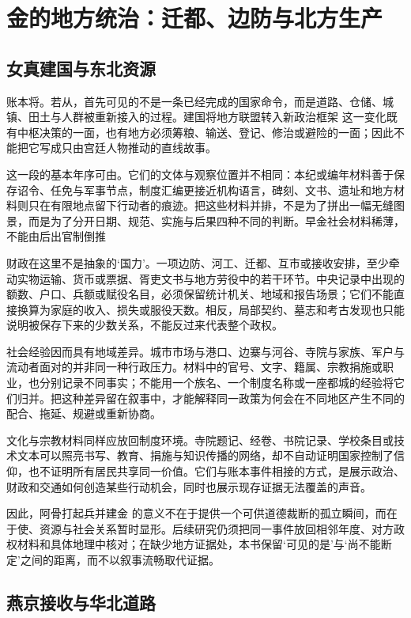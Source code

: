 \section{金的地方统治：迁都、边防与北方生产}

\subsection{女真建国与东北资源}

账本将。若从，首先可见的不是一条已经完成的国家命令，而是道路、仓储、城镇、田土与人群被重新接入的过程。建国将地方联盟转入新政治框架 这一变化既有中枢决策的一面，也有地方必须筹粮、输送、登记、修治或避险的一面；因此不能把它写成只由宫廷人物推动的直线故事。

这一段的基本年序可由。它们的文体与观察位置并不相同：本纪或编年材料善于保存诏令、任免与军事节点，制度汇编更接近机构语言，碑刻、文书、遗址和地方材料则只在有限地点留下行动者的痕迹。把这些材料并排，不是为了拼出一幅无缝图景，而是为了分开日期、规范、实施与后果四种不同的判断。早金社会材料稀薄，不能由后出官制倒推

财政在这里不是抽象的‘国力’。一项边防、河工、迁都、互市或接收安排，至少牵动实物运输、货币或票据、胥吏文书与地方劳役中的若干环节。中央记录中出现的额数、户口、兵额或赋役名目，必须保留统计机关、地域和报告场景；它们不能直接换算为家庭的收入、损失或服役天数。相反，局部契约、墓志和考古发现也只能说明被保存下来的少数关系，不能反过来代表整个政权。

社会经验因而具有地域差异。城市市场与港口、边寨与河谷、寺院与家族、军户与流动者面对的并非同一种行政压力。材料中的官号、文字、籍属、宗教捐施或职业，也分别记录不同事实；不能用一个族名、一个制度名称或一座都城的经验将它们归并。把这种差异留在叙事中，才能解释同一政策为何会在不同地区产生不同的配合、拖延、规避或重新协商。

文化与宗教材料同样应放回制度环境。寺院题记、经卷、书院记录、学校条目或技术文本可以照亮书写、教育、捐施与知识传播的网络，却不自动证明国家控制了信仰，也不证明所有居民共享同一价值。它们与账本事件相接的方式，是展示政治、财政和交通如何创造某些行动机会，同时也展示现存证据无法覆盖的声音。

因此，阿骨打起兵并建金 的意义不在于提供一个可供道德裁断的孤立瞬间，而在于使、资源与社会关系暂时显形。后续研究仍须把同一事件放回相邻年度、对方政权材料和具体地理中核对；在缺少地方证据处，本书保留‘可见的是’与‘尚不能断定’之间的距离，而不以叙事流畅取代证据。

\subsection{燕京接收与华北道路}

